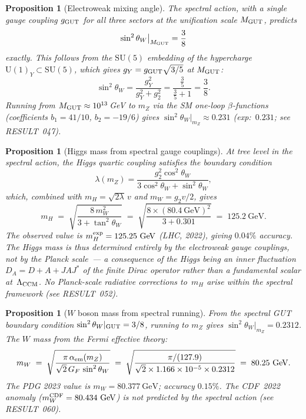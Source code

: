 \documentclass[12pt]{article}
\newtheorem{proposition}[theorem]{Proposition}
\theoremstyle{definition}
\theoremstyle{remark}
\newcommand{\SU}{\mathrm{SU}}
\newcommand{\U}{\mathrm{U}}
\begin{document}
\begin{proposition}[Electroweak mixing angle]\label{prop:sin2}
The spectral action, with a single gauge coupling $g_{\rm GUT}$ for all three sectors
at the unification scale $M_{\rm GUT}$, predicts
\begin{equation}
  \sin^2\theta_W\big|_{M_{\rm GUT}} = \frac{3}{8}
\end{equation}
exactly.  This follows from the $\SU(5)$ embedding of the hypercharge $\U(1)_Y \subset \SU(5)$,
which gives $g_Y = g_{\rm GUT}\sqrt{3/5}$ at $M_{\rm GUT}$:
\begin{equation}
  \sin^2\theta_W = \frac{g_Y^2}{g_Y^2 + g_2^2}
  = \frac{\tfrac{3}{5}}{\tfrac{3}{5}+1} = \frac{3}{8}.
\end{equation}
Running from $M_{\rm GUT} \approx 10^{13}$\,GeV to $m_Z$ via the SM one-loop
$\beta$-functions (coefficients $b_1 = 41/10$, $b_2 = -19/6$) gives
$\sin^2\theta_W|_{m_Z} \approx 0.231$ (exp:\ $0.231$; see RESULT~047).
\end{proposition}

\begin{proposition}[Higgs mass from spectral gauge couplings]
\label{prop:higgs_mass}
At tree level in the spectral action, the Higgs quartic coupling satisfies the
boundary condition
\begin{equation}
  \lambda(m_Z) = \frac{g_2^2 \cos^2\!\theta_W}{3\cos^2\!\theta_W + \sin^2\!\theta_W},
\end{equation}
which, combined with $m_H = \sqrt{2\lambda}\,v$ and $m_W = g_2 v/2$, gives
\begin{equation}
  m_H \;=\; \sqrt{\frac{8\,m_W^2}{3 + \tan^2\!\theta_W}}
  \;=\; \sqrt{\frac{8\times (80.4\ \mathrm{GeV})^2}{3 + 0.301}}
  \;=\; 125.2\ \mathrm{GeV}.
\end{equation}
The observed value is $m_H^{\rm exp} = 125.25\ \mathrm{GeV}$ (LHC, 2022), giving
$0.04\%$ accuracy.  The Higgs mass is thus determined entirely by the
electroweak gauge couplings, not by the Planck scale~--- a consequence of the
Higgs being an inner fluctuation $D_A = D + A + JAJ^\ast$ of the finite Dirac
operator rather than a fundamental scalar at~$\Lambda_{\rm CCM}$.  No
Planck-scale radiative corrections to~$m_H$ arise within the spectral
framework (see RESULT~052).
\end{proposition}

\begin{proposition}[$W$ boson mass from spectral running]
\label{prop:mW}
From the spectral GUT boundary condition $\sin^2\theta_W|_{\rm GUT} = 3/8$, running
to $m_Z$ gives $\sin^2\theta_W|_{m_Z} = 0.2312$.  The $W$ mass from the
Fermi effective theory:
\begin{equation}
  m_W \;=\; \sqrt{\frac{\pi\,\alpha_{\rm em}(m_Z)}{\sqrt{2}\,G_F\,\sin^2\theta_W}}
  \;=\; \sqrt{\frac{\pi/(127.9)}{\sqrt{2}\times 1.166\times 10^{-5}\times 0.2312}}
  \;=\; 80.25\ \mathrm{GeV}.
\end{equation}
The PDG 2023 value is $m_W = 80.377\ \mathrm{GeV}$; accuracy $0.15\%$.
The CDF~2022 anomaly ($m_W^{\rm CDF} = 80.434\ \mathrm{GeV}$) is not
predicted by the spectral action (see RESULT~060).
\end{proposition}
\end{document}
